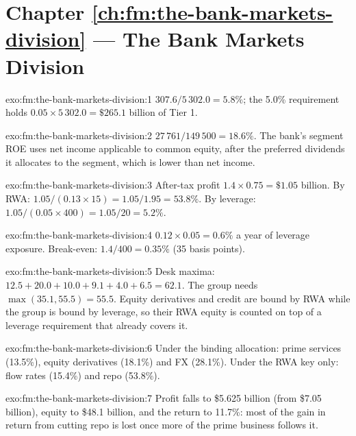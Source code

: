 \section*{Chapter \ref{ch:fm:the-bank-markets-division} --- The Bank Markets Division}

\begin{solution}{exo:fm:the-bank-markets-division:1}
$307.6/5\,302.0=5.8\%$; the 5.0\% requirement holds $0.05\times5\,302.0=\$265.1$ billion of Tier 1.
\end{solution}

\begin{solution}{exo:fm:the-bank-markets-division:2}
$27\,761/149\,500=18.6\%$. The bank's segment ROE uses net income applicable to common equity, after the preferred dividends it allocates to the
segment, which is lower than net income.
\end{solution}

\begin{solution}{exo:fm:the-bank-markets-division:3}
After-tax profit $1.4\times0.75=\$1.05$ billion. By RWA: $1.05/(0.13\times15)=1.05/1.95=53.8\%$. By leverage: $1.05/(0.05\times400)=1.05/20=5.2\%$.
\end{solution}

\begin{solution}{exo:fm:the-bank-markets-division:4}
$0.12\times0.05=0.6\%$ a year of leverage exposure. Break-even: $1.4/400=0.35\%$ (35 basis points).
\end{solution}

\begin{solution}{exo:fm:the-bank-markets-division:5}
Desk maxima: $12.5+20.0+10.0+9.1+4.0+6.5=62.1$. The group needs $\max(35.1, 55.5)=55.5$. Equity derivatives and credit are bound by RWA while the
group is bound by leverage, so their RWA equity is counted on top of a leverage requirement that already covers it.
\end{solution}

\begin{solution}{exo:fm:the-bank-markets-division:6}
Under the binding allocation: prime services (13.5\%), equity derivatives (18.1\%) and FX (28.1\%). Under the RWA key only: flow rates (15.4\%) and
repo (53.8\%).
\end{solution}

\begin{solution}{exo:fm:the-bank-markets-division:7}
Profit falls to \$5.625 billion (from \$7.05 billion), equity to \$48.1 billion, and the return to 11.7\%: most of the gain in return from cutting
repo is lost once more of the prime business follows it.
\end{solution}


